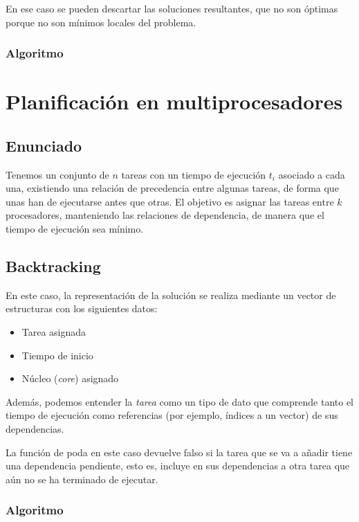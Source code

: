\documentclass[a4paper, 11pt]{article} %
\begin{document}
	En ese caso se pueden descartar las soluciones resultantes, que no son óptimas porque no son mínimos locales del problema.
    
    \subsubsection{Algoritmo}
    
    \small
    \texttt{}
    \normalsize
    
    \section{Planificación en multiprocesadores}
    \subsection{Enunciado}
    Tenemos un conjunto de $n$ tareas con un tiempo de ejecución $t_i$ asociado a cada una, existiendo una 
    relación de precedencia entre algunas tareas, de forma que unas han de ejecutarse antes que otras. 
    El objetivo es asignar las tareas entre $k$ procesadores, manteniendo las relaciones de dependencia,
    de manera que el tiempo de ejecución sea mínimo. 
    
    
    \subsection{Backtracking}
    En este caso, la representación de la solución se realiza mediante un vector de estructuras con los siguientes datos:
    \begin{itemize}
        \item Tarea asignada
        \item Tiempo de inicio
        \item Núcleo (\textit{core}) asignado
    \end{itemize}
    Además, podemos entender la \textit{tarea} como un tipo de dato que comprende tanto el tiempo de ejecución como referencias (por ejemplo, índices a un vector) de sus dependencias.
    
    La función de poda en este caso devuelve falso si la tarea que se va a añadir tiene una dependencia pendiente, esto es, incluye en sus dependencias a otra tarea que aún no se ha terminado de ejecutar.
    
    \subsubsection{Algoritmo}
    
\end{document}
